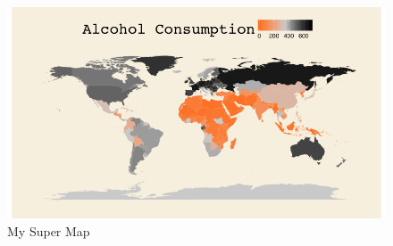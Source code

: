 \documentclass[preprint,12pt]{elsarticle} %
\begin{document}
\begin{figure}[h!]
  \caption{My Super Map}
  \centering
  \includegraphics[width=1\textwidth]{AlcoholConsumptionMap}
\end{figure}





\lipsum[2]












\end{document}
